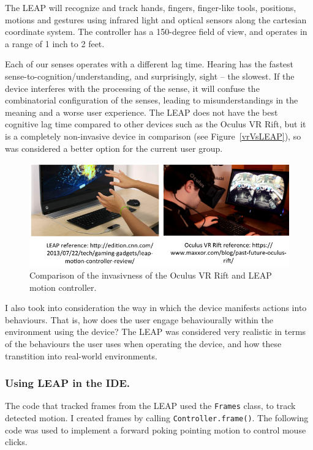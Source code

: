 \documentclass[a4paper, 11pt]{article}
\begin{document}
The LEAP will recognize and track hands, fingers, finger-like tools, positions, motions and gestures using infrared light and optical sensors along the cartesian coordinate system. The controller has a 150-degree field of view, and operates in a range of 1 inch to 2 feet.  

\vspace{5mm}
Each of our senses operates with a different lag time. Hearing has the fastest sense-to-cognition/understanding, and surprisingly, sight -- the slowest. If the device interferes with the processing of the sense, it will confuse the combinatorial configuration of the senses, leading to misunderstandings in the meaning and a worse user experience. The LEAP does not have the best cognitive lag time compared to other devices such as the Oculus VR Rift, but it is a completely non-invasive device in comparison (see Figure~\ref{vrVsLEAP}), so was considered a better option for the current user group.

\begin{figure}[H]
\begin{center}
\includegraphics[scale=0.5]{VRvsLEAP}
\caption{Comparison of the invasivness of the Oculus VR Rift and LEAP motion controller.}
\label{saveScores}
\end{center}
\end{figure}

I also took into consideration the way in which the device manifests actions into behaviours. That is, how does the user engage behaviourally within the environment using the device? The LEAP was considered very realistic in terms of the behaviours the user uses when operating the device, and how these transtition into real-world environments.

\subsubsection{Using LEAP in the IDE.}
The code that tracked frames from the LEAP used the \texttt{Frames} class, to track detected motion. I created frames by calling \texttt{Controller.frame()}. The following code was used to implement a forward poking pointing motion to control mouse clicks.
\end{document}

